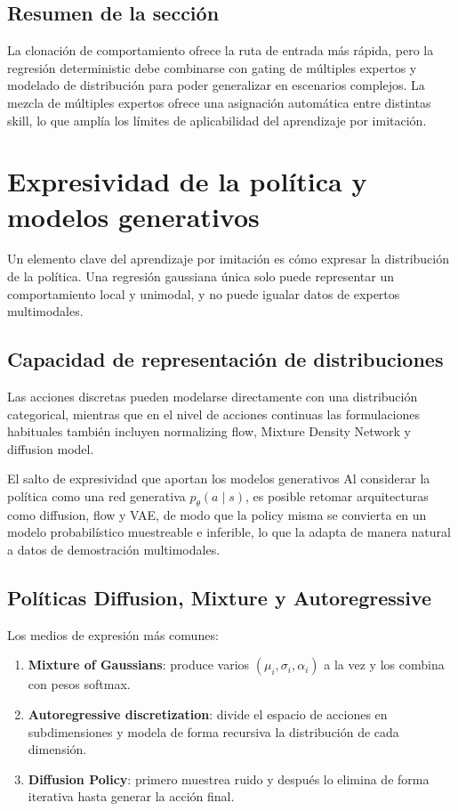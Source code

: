 \documentclass[a4paper]{article}
\begin{document}
\subsection{Resumen de la sección}

La clonación de comportamiento ofrece la ruta de entrada más rápida, pero la regresión deterministic debe combinarse con gating de múltiples expertos y modelado de distribución para poder generalizar en escenarios complejos. La mezcla de múltiples expertos ofrece una asignación automática entre distintas skill, lo que amplía los límites de aplicabilidad del aprendizaje por imitación.

\section{Expresividad de la política y modelos generativos}

Un elemento clave del aprendizaje por imitación es cómo expresar la distribución de la política. Una regresión gaussiana única solo puede representar un comportamiento local y unimodal, y no puede igualar datos de expertos multimodales.

\subsection{Capacidad de representación de distribuciones}

Las acciones discretas pueden modelarse directamente con una distribución categorical, mientras que en el nivel de acciones continuas las formulaciones habituales también incluyen normalizing flow, Mixture Density Network y diffusion model.

\begin{importantbox}{El salto de expresividad que aportan los modelos generativos}
Al considerar la política como una red generativa $p_\theta(a \mid s)$, es posible retomar arquitecturas como diffusion, flow y VAE, de modo que la policy misma se convierta en un modelo probabilístico muestreable e inferible, lo que la adapta de manera natural a datos de demostración multimodales.
\end{importantbox}

\subsection{Políticas Diffusion, Mixture y Autoregressive}

Los medios de expresión más comunes:
\begin{enumerate}
    \item \textbf{Mixture of Gaussians}: produce varios $(\mu_i, \sigma_i, \alpha_i)$ a la vez y los combina con pesos softmax.
    \item \textbf{Autoregressive discretization}: divide el espacio de acciones en subdimensiones y modela de forma recursiva la distribución de cada dimensión.
    \item \textbf{Diffusion Policy}: primero muestrea ruido y después lo elimina de forma iterativa hasta generar la acción final.
\end{enumerate}
\end{document}
